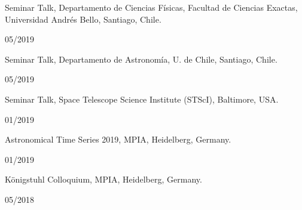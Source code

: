 \documentclass[12pt, a4paper]{article} %
\begin{document}
\begin{minipage}[t]{0.7\textwidth}
\begin{flushleft}%
  \setlength{\leftskip}{0.2cm}%
Seminar Talk, Departamento de Ciencias F\'isicas, Facultad de Ciencias
Exactas, Universidad Andr\'es Bello, Santiago, Chile.
\end{flushleft}
\end{minipage}
\begin{minipage}[t]{0.3\textwidth}
\hfill 05/2019
\end{minipage}


\begin{minipage}[t]{0.7\textwidth}
\begin{flushleft}%
  \setlength{\leftskip}{0.2cm}%
Seminar Talk, Departamento de Astronom\'ia, U. de Chile, Santiago, Chile.
\end{flushleft}
\end{minipage}
\begin{minipage}[t]{0.3\textwidth}
\hfill 05/2019
\end{minipage}

\begin{minipage}[t]{0.7\textwidth}
\begin{flushleft}%
  \setlength{\leftskip}{0.2cm}%
Seminar Talk, Space Telescope Science Institute (STScI), Baltimore, USA.
\end{flushleft}
\end{minipage}
\begin{minipage}[t]{0.3\textwidth}
\hfill 01/2019
\end{minipage}

\begin{minipage}[t]{0.7\textwidth}
\begin{flushleft}%
  \setlength{\leftskip}{0.2cm}%
Astronomical Time Series 2019, MPIA, Heidelberg, Germany.
\end{flushleft}
\end{minipage}
\begin{minipage}[t]{0.3\textwidth}
\hfill 01/2019
\end{minipage}

\begin{minipage}[t]{0.7\textwidth}
\begin{flushleft}%
  \setlength{\leftskip}{0.2cm}%
Königstuhl Colloquium, MPIA, Heidelberg, Germany.
\end{flushleft}
\end{minipage}
\begin{minipage}[t]{0.3\textwidth}
\hfill 05/2018
\end{minipage}
\end{document}
